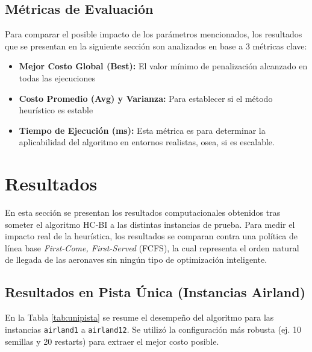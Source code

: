 \documentclass[letter, 10pt]{article}
\begin{document}
\subsection{Métricas de Evaluación}
Para comparar el posible impacto de los parámetros mencionados, los resultados que se presentan en la siguiente sección son analizados en base a 3 métricas clave:
\begin{itemize}
    \item \textbf{Mejor Costo Global (Best):} El valor mínimo de penalización alcanzado en todas las ejecuciones
    \item \textbf{Costo Promedio (Avg) y Varianza:} Para establecer si el método heurístico es estable
    \item \textbf{Tiempo de Ejecución (ms):} Esta métrica es para determinar la aplicabilidad del algoritmo en entornos realistas, osea, si es escalable.
\end{itemize}

\section{Resultados}
En esta sección se presentan los resultados computacionales obtenidos tras someter el algoritmo HC-BI a las distintas instancias de prueba. Para medir el impacto real de la heurística, los resultados se comparan contra una política de línea base \textit{First-Come, First-Served} (FCFS), la cual representa el orden natural de llegada de las aeronaves sin ningún tipo de optimización inteligente.

\subsection{Resultados en Pista Única (Instancias Airland)}
En la Tabla \ref{tab:unipista} se resume el desempeño del algoritmo para las instancias \texttt{airland1} a \texttt{airland12}. Se utilizó la configuración más robusta (ej. 10 semillas y 20 restarts) para extraer el mejor costo posible.
\end{document}
